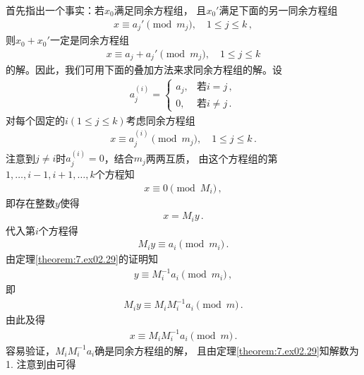 \begin{prove}
    首先指出一个事实：若$x_0$满足同余方程组，
    且$x_0'$满足下面的另一同余方程组
    \begin{align}
        x\equiv a_j'\pmod{m_j},\quad 1\le j\le k\, ,
    \end{align}
    则$x_0+x_0'$一定是同余方程组
    \begin{align}
        x\equiv a_j+a_j'\pmod{m_j},\quad 1\le j\le k
    \end{align}
    的解。因此，我们可用下面的叠加方法来求同余方程组的解。设
    \begin{align}\label{eq:7.ex02.proveCRT03}
        a_j^{(i)}=\left\{\begin{array}{ll}
            a_j, & \text{若}i=j\, ,     \\
            0,   & \text{若}i\neq j\, .
        \end{array}\right.
    \end{align}
    对每个固定的$i(1\le j\le k)$考虑同余方程组
    \begin{align}\label{eq:7.ex02.proveCRT01}
        x\equiv a_j^{(i)}\pmod{m_j},\quad 1\le j\le k\, .
    \end{align}
    注意到$j\neq i$时$a_j^{(i)}=0$，结合$m_j$两两互质，
    由这个方程组的第$1,\ldots,i-1,i+1,\ldots,k$个方程知
    \begin{align}
        x\equiv0\pmod{M_i}\, ,
    \end{align}
    即存在整数$y$使得
    \begin{align}\label{eq:7.ex02.proveCRT02}
        x=M_iy\, .
    \end{align}
    代入第$i$个方程得
    \begin{align}
        M_iy\equiv a_i\pmod{m_i}\, .
    \end{align}
    由定理\ref{theorem:7.ex02.29}的证明知
    \begin{align}
        y\equiv M_i^{-1}a_i\pmod{m_i}\, ,
    \end{align}
    即
    \begin{align}
        M_iy\equiv M_iM_i^{-1}a_i\pmod{m}\, .
    \end{align}
    由此及得
    \begin{align}
        x\equiv M_iM_i^{-1}a_i\pmod{m}\, .
    \end{align}
    容易验证，$M_iM_i^{-1}a_i$确是同余方程组的解，
    且由定理\ref{theorem:7.ex02.29}知解数为1.
    注意到由可得

\end{prove}
